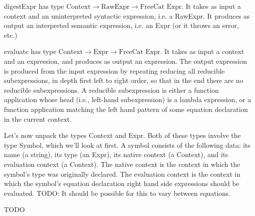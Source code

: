 \documentclass{article}
\begin{document}
digestExpr has type $\text{Context} \to \text{RawExpr} \to \text{FreeCat Expr}$. It takes as input a context and an uninterpreted syntactic expression, i.e. a RawExpr. It produces as output an interpreted semantic expression, i.e. an Expr (or it throws an error, etc.)

evaluate has type $\text{Context} \to \text{Expr} \to \text{FreeCat Expr}$. It takes as input a context and an expression, and produces as output an expression. The output expression is produced from the input expression by repeating reducing all reducible subexpressions, in depth first left to right order, so that in the end there are no reducible subexpressions. A reducible subexpression is either a function application whose head (i.e., left-hand subexpression) is a lambda expression, or a function application matching the left hand pattern of some equation declaration in the current context.

Let's now unpack the types Context and Expr. Both of these types involve the type Symbol, which we'll look at first. A symbol consists of the following data: its name (a string), its type (an Expr), its native context (a Context), and its evaluation context (a Context). The native context is the context in which the symbol's type was originally declared. The evaluation context is the context in which the symbol's equation declaration right hand side expressions should be evaluated. TODO: It should be possible for this to vary between equations.

TODO
\end{document}
